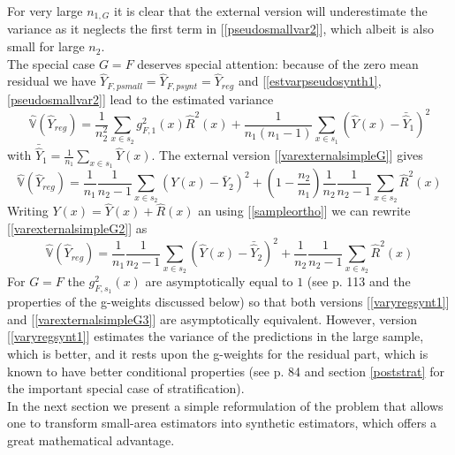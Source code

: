 \documentclass[a4paper,12pt,leqno, titlepage]{article}
\newcommand{\VAR}{\mathbb{V}}
\begin{document}
For very large $n_{1,G}$ it is clear that the external version will underestimate the variance
as it neglects the first term in [\ref{pseudosmallvar2}], which albeit is also small for large $n_2$. \\
The special case $G=F$ deserves special attention: because of the zero mean residual we have $\hat{Y}_{F,psmall}=\hat{Y}_{F,psynt}=\hat{Y}_{reg}$ and [\ref{estvarpseudosynth1},\ref{pseudosmallvar2}] lead to the estimated variance
\begin{equation}\label{varyregsynt1}
\hat{\VAR}(\hat{Y}_{reg})=\frac{1}{n^2_2}\sum_{x\in{s_2}}g^2_{F,1}(x)\hat{R}^2(x)
+ \frac{1}{n_1(n_1-1)}
\sum_{x\in{s_1}}(\hat{Y}(x)-\bar{\hat{Y}}_1)^2
\end{equation}
with $\bar{\hat{Y}}_1=\frac{1}{n_1}\sum_{x\in{s_1}}\hat{Y}(x)$. The external version
[\ref{varexternalsimpleG}] gives
\begin{equation}\label{varexternalsimpleG2}
\hat{\VAR}(\hat{Y}_{reg})=\frac{1}{n_1}\frac{1}{n_2-1}\sum_{x\in{s_2}}(Y(x)-\bar{Y}_2)^2+
(1-\frac{n_{2}}{n_{1}})
\frac{1}{n_{2}}\frac{1}{n_{2}-1}\sum_{x\in{s_{2}}}\hat{R}^2(x)
 \end{equation}
 Writing $Y(x)=\hat{Y}(x)+\hat{R}(x)$ an using [\ref{sampleortho}] we can rewrite [\ref{varexternalsimpleG2}] as
 \begin{equation}\label{varexternalsimpleG3}
 \hat{\VAR}(\hat{Y}_{reg})=\frac{1}{n_1}\frac{1}{n_2-1}\sum_{x\in{s_2}}(\hat{Y}(x)-\bar{\hat{Y}}_2)^2+
\frac{1}{n_{2}}\frac{1}{n_{2}-1}\sum_{x\in{s_{2}}}\hat{R}^2(x)
\end{equation}
For $G=F$ the $g^2_{F,s_1}(x)$ are asymptotically equal to $1$ (see \cite{mandallaz} p. 113 and the properties of the g-weights discussed below) so that both versions [\ref{varyregsynt1}] and [\ref{varexternalsimpleG3}] are asymptotically equivalent. However, version [\ref{varyregsynt1}] estimates the variance of the predictions in the large sample, which is better, and it rests upon the g-weights for the residual part, which is known to have better conditional properties (see \cite{mandallaz} p. 84 and section \ref{poststrat} for the important special case of stratification).\\
In the next section we present a simple reformulation of the problem that allows one to transform small-area estimators into synthetic estimators, which offers a great mathematical advantage.
\end{document}
